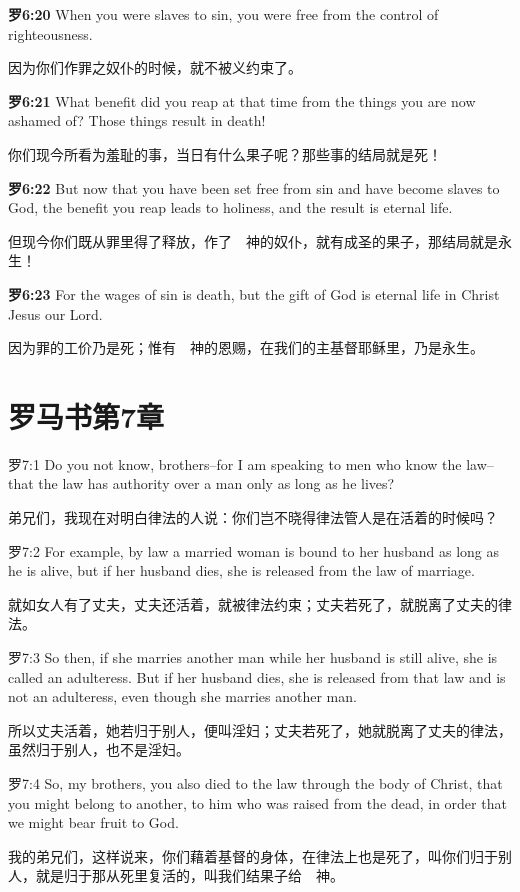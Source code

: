 \documentclass[a4paper,11pt,onecolumn,twoside]{ctexart}
\begin{document}
\begin{multicols}{2}
 \textbf{罗6:20}
 When you were slaves to sin, you were free from the control of righteousness.

 因为你们作罪之奴仆的时候，就不被义约束了。


 \textbf{罗6:21}
 What benefit did you reap at that time from the things you are now ashamed of? Those things result in death!

 你们现今所看为羞耻的事，当日有什么果子呢？那些事的结局就是死！


 \textbf{罗6:22}
 But now that you have been set free from sin and have become slaves to God, the benefit you reap leads to holiness, and the result is eternal life.

 但现今你们既从罪里得了释放，作了　神的奴仆，就有成圣的果子，那结局就是永生！


 \textbf{罗6:23}
 For the wages of sin is death, but the gift of God is eternal life in Christ Jesus our Lord.

 因为罪的工价乃是死；惟有　神的恩赐，在我们的主基督耶稣里，乃是永生。


\section{ 罗马书第7章}
 罗7:1
 Do you not know, brothers--for I am speaking to men who know the law--that the law has authority over a man only as long as he lives?

 弟兄们，我现在对明白律法的人说：你们岂不晓得律法管人是在活着的时候吗？


 罗7:2
 For example, by law a married woman is bound to her husband as long as he is alive, but if her husband dies, she is released from the law of marriage.

 就如女人有了丈夫，丈夫还活着，就被律法约束；丈夫若死了，就脱离了丈夫的律法。


 罗7:3
 So then, if she marries another man while her husband is still alive, she is called an adulteress. But if her husband dies, she is released from that law and is not an adulteress, even though she marries another man.

 所以丈夫活着，她若归于别人，便叫淫妇；丈夫若死了，她就脱离了丈夫的律法，虽然归于别人，也不是淫妇。


 罗7:4
 So, my brothers, you also died to the law through the body of Christ, that you might belong to another, to him who was raised from the dead, in order that we might bear fruit to God.

 我的弟兄们，这样说来，你们藉着基督的身体，在律法上也是死了，叫你们归于别人，就是归于那从死里复活的，叫我们结果子给　神。



\end{multicols}
\end{document}

